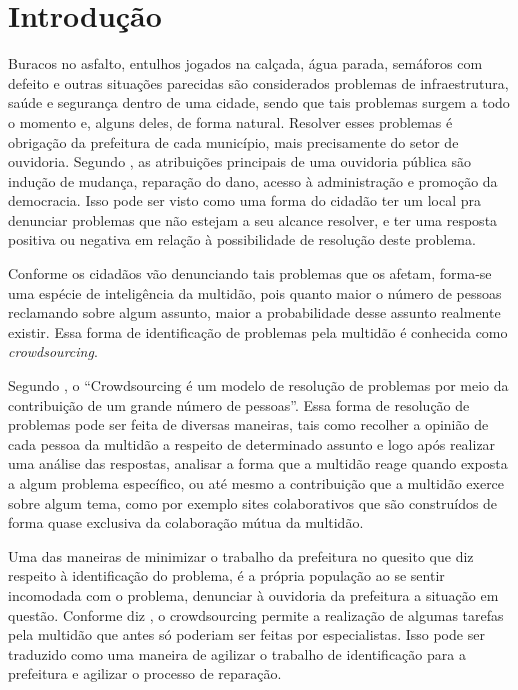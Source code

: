 \documentclass[
	12pt,				%
	openright,			%
	oneside,			%
	a4paper,			%
	english,			%
	french,				%
	spanish,			%
	brazil				%
	]{abntex2}
\begin{document}
\chapter[Introdução]{Introdução}

Buracos no asfalto, entulhos jogados na calçada, água parada, semáforos com defeito e outras situações parecidas são considerados problemas de infraestrutura, saúde e segurança dentro de uma cidade, sendo que tais problemas surgem a todo o momento e, alguns deles, de forma natural.
Resolver esses problemas é obrigação da prefeitura de cada município, mais precisamente do setor de ouvidoria. Segundo \cite{lyra2004ouvidor}, as atribuições principais de uma ouvidoria pública são indução de mudança, reparação do dano, acesso à administração e promoção da democracia. Isso pode ser visto como uma forma do cidadão ter um local pra denunciar problemas que não estejam a seu alcance resolver, e ter uma resposta positiva ou negativa em relação à possibilidade de resolução deste problema.

Conforme os cidadãos vão denunciando tais problemas que os afetam, forma-se uma espécie de inteligência da multidão, pois quanto maior o número de pessoas reclamando sobre algum assunto, maior a probabilidade desse assunto realmente existir. Essa forma de identificação de problemas pela multidão é conhecida como \textit{crowdsourcing}.

Segundo \cite{quirino2016estrategias}, o “Crowdsourcing é um modelo de resolução de problemas por meio da contribuição de um grande número de pessoas”. Essa forma de resolução de problemas pode ser feita de diversas maneiras, tais como recolher a opinião de cada pessoa da multidão a respeito de determinado assunto e logo após realizar uma análise das respostas, analisar a forma que a multidão reage quando exposta a algum problema específico, ou até mesmo a contribuição que a multidão exerce sobre algum tema, como por exemplo sites colaborativos que são construídos de forma quase exclusiva da colaboração mútua da multidão.

Uma das maneiras de minimizar o trabalho da prefeitura no quesito que diz respeito à identificação do problema, é a própria população ao se sentir incomodada com o problema, denunciar à ouvidoria da prefeitura a situação em questão. Conforme diz \cite{galoppiniprojeto}, o crowdsourcing permite a realização de algumas tarefas pela multidão que antes só poderiam ser feitas por especialistas. Isso pode ser traduzido como uma maneira de agilizar o trabalho de identificação para a prefeitura e agilizar o processo de reparação.
\end{document}
